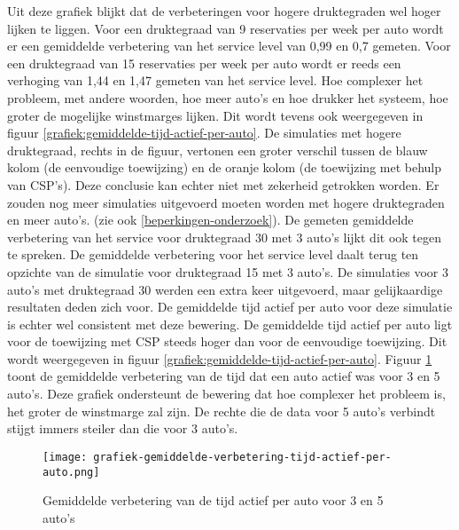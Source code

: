 Uit deze grafiek blijkt dat de verbeteringen voor hogere druktegraden wel hoger lijken te liggen. Voor een druktegraad van 9 reservaties per week per auto wordt er een gemiddelde verbetering van het service level van 0,99 en 0,7 gemeten. Voor een druktegraad van 15 reservaties per week per auto wordt er reeds een verhoging van 1,44 en 1,47 gemeten van het service level. Hoe complexer het probleem, met andere woorden, hoe meer auto's en hoe drukker het systeem, hoe groter de mogelijke winstmarges lijken. Dit wordt tevens ook weergegeven in figuur \ref{grafiek:gemiddelde-tijd-actief-per-auto}. De simulaties met hogere druktegraad, rechts in de figuur, vertonen een groter verschil tussen de blauw kolom (de eenvoudige toewijzing) en de oranje kolom (de toewijzing met behulp van CSP's). Deze conclusie kan echter niet met zekerheid getrokken worden. Er zouden nog meer simulaties uitgevoerd moeten worden met hogere druktegraden en meer auto's. (zie ook \ref{beperkingen-onderzoek}). De gemeten gemiddelde verbetering van het service voor druktegraad 30 met 3 auto's lijkt dit ook tegen te spreken. De gemiddelde verbetering voor het service level daalt terug ten opzichte van de simulatie voor druktegraad 15 met 3 auto's. De simulaties voor 3 auto's met druktegraad 30 werden een extra keer uitgevoerd, maar gelijkaardige resultaten deden zich voor. De gemiddelde tijd actief per auto voor deze simulatie is echter wel consistent met deze bewering. 
De gemiddelde tijd actief per auto ligt voor de toewijzing met CSP steeds hoger dan voor de eenvoudige toewijzing. Dit wordt weergegeven in figuur \ref{grafiek:gemiddelde-tijd-actief-per-auto}.
Figuur \ref{grafiek:gemiddelde-verbetering-tijd-actief} toont de gemiddelde verbetering van de tijd dat een auto actief was voor 3 en 5 auto's. Deze grafiek ondersteunt de bewering dat hoe complexer het probleem is, het groter de winstmarge zal zijn. De rechte die de data voor 5 auto's verbindt stijgt immers steiler dan die voor 3 auto's.
\begin{figure}[h]
	\texttt{[image: grafiek-gemiddelde-verbetering-tijd-actief-per-auto.png]}
	\caption[Grafiek van de gemiddelde verbetering van de tijd actief per auto]{Gemiddelde verbetering van de tijd actief per auto voor 3 en 5 auto's}
	\label{grafiek:gemiddelde-verbetering-tijd-actief}
\end{figure}

